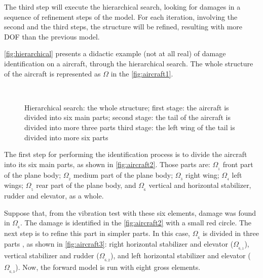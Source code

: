The third step will execute the hierarchical search, looking for damages in a sequence of refinement steps of the model. For each iteration, involving the second and the third steps, the structure will be refined, resulting with more DOF than the previous model.

\autoref{fig:hierarchical} presents a didactic example (not at all real) of damage identification on a aircraft, through the hierarchical search. The whole structure of the aircraft is represented as $\Omega$ in the \autoref{fig:aircraft1}.

\begin{figure}[H]%
\centering
\caption[Hierarchical search]{Hierarchical search:
 the whole structure;
 first stage: the aircraft is divided into six main parts;
 second stage: the tail of the aircraft is divided into more three parts  third stage: the left wing of the tail is divided into more six parts}%
\label{fig:hierarchical}%
%
\\
%
\end{figure}

The first step for performing the identification process is to divide the aircraft into its six main parts, as shown in \autoref{fig:aircraft2}. Those parts are: $\Omega_{_1}$ front part of the plane body; $\Omega_{_2}$ medium part of the plane body; $\Omega_{_3}$ right wing; $\Omega_{_4}$ left wings; $\Omega_{_5}$ rear part of the plane body, and $\Omega_{_6}$ vertical and horizontal stabilizer, rudder and elevator, as a whole.

Suppose that, from the vibration test with these six elements, damage was found in $\Omega_{_6}$. The damage is identified in the \autoref{fig:aircraft2} with a small red circle. The next step is to refine this part in simpler parts. In this case, $\Omega_{_6}$ is divided in three parts , as shown in \autoref{fig:aircraft3}: right horizontal stabilizer and elevator ($\Omega_{_{6,1}}$), vertical stabilizer and rudder ($\Omega_{_{6,2}}$), and left horizontal stabilizer and elevator ($\Omega_{_{6,3}}$). Now, the forward model is run with eight gross elements.

